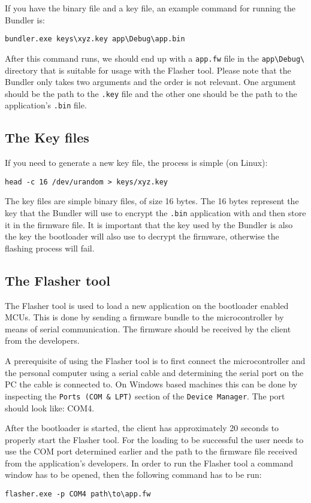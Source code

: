 \documentclass[10pt,a4paper,twoside]{article}
\begin{document}
If you have the binary file and a key file, an example command for running the Bundler is:
\begin{verbatim}
bundler.exe keys\xyz.key app\Debug\app.bin
\end{verbatim}

After this command runs, we should end up with a \texttt{app.fw} file in the \texttt{app\textbackslash Debug\textbackslash} directory that is suitable for usage with the Flasher tool.
Please note that the Bundler only takes two arguments and the order is not relevant. One argument should be the path to the \texttt{.key} file and the other one should be the path to the application's \texttt{.bin} file.

\subsection{The Key files}
If you need to generate a new key file, the process is simple (on Linux):
\begin{verbatim}
head -c 16 /dev/urandom > keys/xyz.key
\end{verbatim}

The key files are simple binary files, of size 16 bytes. The 16 bytes represent the key that the Bundler will use to encrypt the \texttt{.bin} application with and then store it in the firmware file. It is important that the key used by the Bundler is also the key the bootloader will also use to decrypt the firmware, otherwise the flashing process will fail.

\subsection{The Flasher tool}
The Flasher tool is used to load a new application on the bootloader enabled MCUs. This is done by sending a firmware bundle to the microcontroller by means of serial communication. The firmware should be received by the client from the developers.

A prerequisite of using the Flasher tool is to first connect the microcontroller and the personal computer using a serial cable and determining the serial port on the PC the cable is connected to. On Windows based machines this can be done by inspecting the \texttt{Ports (COM \& LPT)} section of the \texttt{Device Manager}. The port should look like: COM4.

After the bootloader is started, the client has approximately 20 seconds to properly start the Flasher tool.
For the loading to be successful the user needs to use the COM port determined earlier and the path to the firmware file received from the application's developers.
In order to run the Flasher tool a command window has to be opened, then the following command has to be run:
\begin{verbatim}
flasher.exe -p COM4 path\to\app.fw
\end{verbatim}
\end{document}
